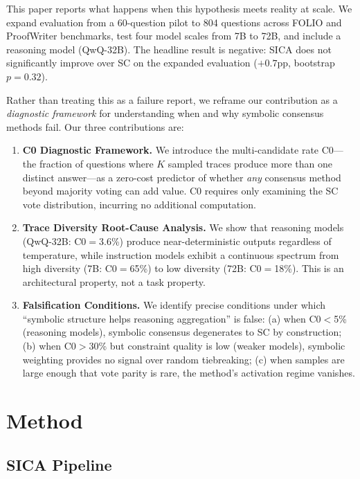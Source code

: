 \documentclass[11pt]{article}
\begin{document}
This paper reports what happens when this hypothesis meets reality at scale. We expand evaluation from a 60-question pilot to 804 questions across FOLIO and ProofWriter benchmarks, test four model scales from 7B to 72B, and include a reasoning model (QwQ-32B). The headline result is negative: SICA does not significantly improve over SC on the expanded evaluation ($+0.7$pp, bootstrap $p=0.32$).

Rather than treating this as a failure report, we reframe our contribution as a \emph{diagnostic framework} for understanding when and why symbolic consensus methods fail. Our three contributions are:

\begin{enumerate}
    \item \textbf{C0 Diagnostic Framework.} We introduce the multi-candidate rate C0---the fraction of questions where $K$ sampled traces produce more than one distinct answer---as a zero-cost predictor of whether \emph{any} consensus method beyond majority voting can add value. C0 requires only examining the SC vote distribution, incurring no additional computation.

    \item \textbf{Trace Diversity Root-Cause Analysis.} We show that reasoning models (QwQ-32B: C0$=$3.6\%) produce near-deterministic outputs regardless of temperature, while instruction models exhibit a continuous spectrum from high diversity (7B: C0$=$65\%) to low diversity (72B: C0$=$18\%). This is an architectural property, not a task property.

    \item \textbf{Falsification Conditions.} We identify precise conditions under which ``symbolic structure helps reasoning aggregation'' is false: (a) when C0$<$5\% (reasoning models), symbolic consensus degenerates to SC by construction; (b) when C0$>$30\% but constraint quality is low (weaker models), symbolic weighting provides no signal over random tiebreaking; (c) when samples are large enough that vote parity is rare, the method's activation regime vanishes.
\end{enumerate}

\section{Method}

\subsection{SICA Pipeline}
\end{document}
